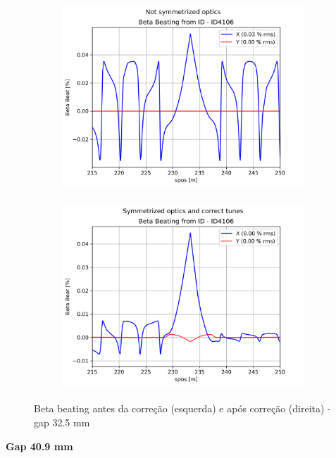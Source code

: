 \documentclass[a4paper,12pt]{article}
\begin{document}
\begin{figure}[H]
\begin{subfigure}{0.5\textwidth}
\includegraphics[width=0.9\linewidth, height=7cm]{figs/phase-16 gap32 uncorrected-optics.png} 
\label{fig:subim1-1632}
\end{subfigure}
\begin{subfigure}{0.5\textwidth}
\includegraphics[width=0.9\linewidth, height=7cm]{figs/phase-16 gap32 corrected-optics-tunes.png}
\label{fig:subim2-1632}
\end{subfigure}
\caption{Beta beating antes da correção (esquerda) e após correção (direita) - gap 32.5 mm}
\label{fig:bb-16_32}
\end{figure}

\textbf{Gap 40.9 mm} \\
\end{document}
